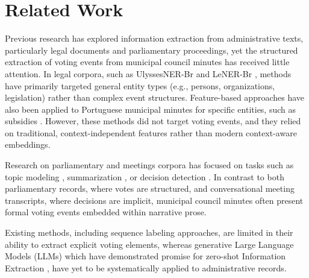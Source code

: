 \documentclass[11pt]{article}
\begin{document}
\section{Related Work}

Previous research has explored information extraction from administrative texts, particularly legal documents and parliamentary proceedings, yet the structured extraction of voting events from municipal council minutes has received little attention. In legal corpora, such as UlyssesNER-Br \cite{ulyssesner} and LeNER-Br \cite{LeNER-BR}, methods have primarily targeted general entity types (e.g., persons, organizations, legislation) rather than complex event structures. Feature-based approaches have also been applied to Portuguese municipal minutes for specific entities, such as subsidies \cite{portuguese-municipal-minutes-2010}. However, these methods did not target voting events, and they relied on traditional, context-independent features rather than modern context-aware embeddings.

Research on parliamentary and meetings corpora has focused on tasks such as topic modeling \cite{Erjavec2023-parlamentary-ner}, summarization \cite{hu-etal-2023-meetingbank,2022-elitr}, or decision detection \cite{AMI_meeting_corpus}. In contrast to both parliamentary records, where votes are structured, and conversational meeting transcripts, where decisions are implicit, municipal council minutes often present formal voting events embedded within narrative prose. 
 
Existing methods, including sequence labeling approaches, are limited in their ability to extract explicit voting elements, whereas generative Large Language Models (LLMs) which have demonstrated promise for zero-shot Information Extraction \cite{wadhwa-etal-2023-revisiting}, have yet to be systematically applied to administrative records. %

\end{document}

